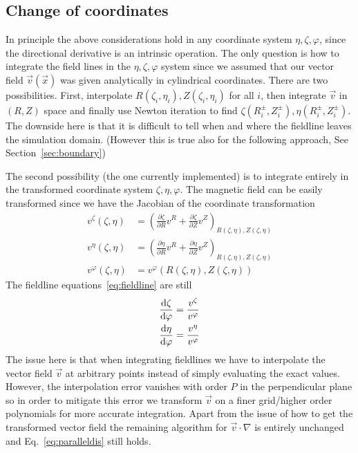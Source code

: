 \subsection{Change of coordinates}
In principle the above considerations hold in any
coordinate system $\eta,\zeta,\varphi$, since the directional derivative is
an intrinsic operation.
The only question is how to integrate the field lines in the
$\eta, \zeta,\varphi$ system
since we assumed that our vector field $\vec v(\vec x)$ was given
analytically in
cylindrical coordinates. There are two possibilities.
First, interpolate $R(\zeta_i, \eta_i), Z(\zeta_i, \eta_i)$ for
all $i$, then integrate $\vec v$ in $(R,Z)$ space and finally use
Newton iteration to find $\zeta(R^\pm_i, Z^\pm_i), \eta(R^\pm_i, Z^\pm_i)$.
The downside here is that it is difficult to tell when and where the fieldline leaves the simulation domain. (However this is true also for the
following approach, See Section~\ref{sec:boundary})

The second possibility (the one currently implemented)
is to integrate entirely in the
transformed coordinate system $\zeta, \eta, \varphi$.
The magnetic field can be easily transformed since we have the
Jacobian of the coordinate transformation
\begin{align}
    v^\zeta(\zeta, \eta) &= \left(\frac{\partial \zeta}{\partial R} v^{R} + \frac{\partial \zeta}{\partial Z}v^Z\right)_{R(\zeta, \eta), Z(\zeta, \eta)} \\
    v^\eta(\zeta, \eta) &= \left(\frac{\partial \eta}{\partial R} v^{R} + \frac{\partial \eta}{\partial Z}v^Z\right)_{R(\zeta, \eta), Z(\zeta, \eta)} \\
    v^\varphi(\zeta, \eta) &= v^\varphi({R(\zeta, \eta), Z(\zeta, \eta)})
    \label{eq:field_trafo}
\end{align}
The fieldline equations~\eqref{eq:fieldline} are still
\begin{subequations}
\begin{align}
\frac{\mathrm{d} \zeta}{\mathrm{d}\varphi} &= \frac{v^\zeta}{v^\varphi}\\
\frac{\mathrm{d} \eta}{\mathrm{d}\varphi} &= \frac{v^\eta}{v^\varphi}
\end{align}
\label{eq:fieldlines}
\end{subequations}
The issue here is that when integrating fieldlines we
have to interpolate the vector field $\vec v$ at arbitrary points
instead of simply evaluating the exact values.
However, the interpolation error vanishes with order $P$ in the
perpendicular plane so in order to mitigate this error
we transform $\vec v$ on a finer grid/higher order polynomials for more accurate
integration.
Apart from the issue of how to get the transformed vector field
the remaining algorithm for $\vec v\cdot\nabla$ is entirely unchanged
and Eq.~\eqref{eq:paralleldis} still holds.


